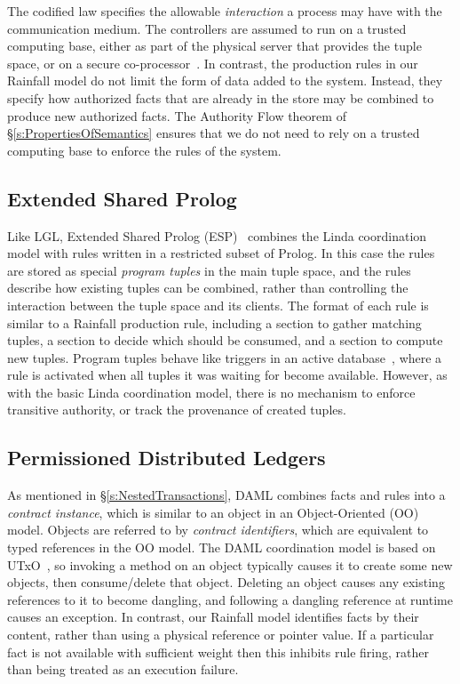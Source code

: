 The codified law specifies the allowable \emph{interaction} a process may have with the communication medium. The controllers are assumed to run on a trusted computing base, either as part of the physical server that provides the tuple space, or on a secure co-processor~\cite{Minsky2001:SafeTupleSpace}. In contrast, the production rules in our Rainfall model do not limit the form of data added to the system. Instead, they specify how authorized facts that are already in the store may be combined to produce new authorized facts. The Authority Flow theorem of \S\ref{s:PropertiesOfSemantics} ensures that we do not need to rely on a trusted computing base to enforce the rules of the system.


\subsection{Extended Shared Prolog}
\label{s:RelatedESP}
Like LGL, Extended Shared Prolog (ESP)~\cite{Ciancarini1993:Coordinating, Ciancarini1994:LogicTupleSpaces} combines the Linda coordination model with rules written in a restricted subset of Prolog. In this case the rules are stored as special \emph{program tuples} in the main tuple space, and the rules describe how existing tuples can be combined, rather than controlling the interaction between the tuple space and its clients. The format of each rule is similar to a Rainfall production rule, including a section to gather matching tuples, a section to decide which should be consumed, and a section to compute new tuples. Program tuples behave like triggers in an active database~\cite{Paton1999:Active}, where a rule is activated when all tuples it was waiting for become available. However, as with the basic Linda coordination model, there is no mechanism to enforce transitive authority, or track the provenance of created tuples.


\subsection{Permissioned Distributed Ledgers}
\label{s:RelatedPermissioned}
As mentioned in \S\ref{s:NestedTransactions}, DAML combines facts and rules into a \emph{contract instance}, which is similar to an object in an Object-Oriented (OO) model. Objects are referred to by \emph{contract identifiers}, which are equivalent to typed references in the OO model. The DAML coordination model is based on UTxO~\cite{Zahnentferner2018:UTxO}, so invoking a method on an object typically causes it to create some new objects, then consume/delete that object. Deleting an object causes any existing references to it to become dangling, and following a dangling reference at runtime causes an exception. In contrast, our Rainfall model identifies facts by their content, rather than using a physical reference or pointer value. If a particular fact is not available with sufficient weight then this inhibits rule firing, rather than being treated as an execution failure.

